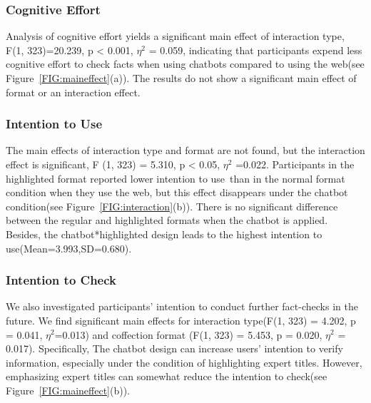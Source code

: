 \subsubsection{Cognitive Effort}
Analysis of cognitive effort yields a significant main effect of interaction type, F(1, 323)=20.239, p < 0.001, $\eta^{2}$ = 0.059, indicating that participants expend less cognitive effort to check facts when using chatbots compared to using the web(see Figure~\ref{FIG:maineffect}(a)). 
The results do not show a significant main effect of format or an interaction effect.

\subsubsection{Intention to Use}
The main effects of interaction type and format are not found, but the interaction effect is significant, F (1, 323) = 5.310, p < 0.05, $\eta^{2}$ =0.022. 
Participants in the highlighted format reported lower intention to use than in the normal format condition when they use the web, but this effect disappears under the chatbot condition(see Figure~\ref{FIG:interaction}(b)).
There is no significant difference between the regular and highlighted formats when the chatbot is applied. Besides, the chatbot*highlighted design leads to the highest intention to use(Mean=3.993,SD=0.680).

\subsubsection{Intention to Check}
We also investigated participants' intention to conduct further fact-checks in the future.
We find significant main effects for interaction type(F(1, 323) = 4.202, p = 0.041, $\eta^{2}$=0.013) and coffection format (F(1, 323) = 5.453, p = 0.020, $\eta^{2}$ = 0.017).
Specifically, The chatbot design can increase users' intention to verify information, especially under the condition of highlighting expert titles.
However, emphasizing expert titles can somewhat reduce the intention to check(see Figure~\ref{FIG:maineffect}(b)).

